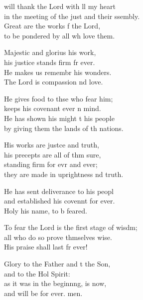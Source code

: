 \settowidth{\versewidth}{To fear the Lord is the first stage of wisdom; +}
\begin{psalmverse}%
  \begin{patverse}
 will thank the Lord with ll my heart\Med\\
    in the meeting of the just and their ssembly.\\
Great are the works f the Lord,\Med\\
    to be pondered by all wh love them.

Majestic and glorius his work,\Med\\
    his justice stands firm fr ever.\\
He makes us remembr his wonders.\Med\\
    The Lord is compassion nd love.

He gives food to thse who fear him;\Med\\
    keeps his covenant ever \pointup{\i}n mind.\\
He has shown his might t his people\Med\\
    by giving them the lands of th nations.

His works are just\pointup{\i}ce and truth,\Med\\
    his precepts are all of thm sure,\\
standing firm for evr and ever;\Med\\
    they are made in uprightness nd truth.

He has sent deliverance to his peopl\Flex\\
    and established his covennt for ever.\Med\\
    Holy his name, to b feared.

To fear the Lord is the first stage of wisdm;\Flex\\
    all who do so prove thmselves wise.\Med\\
His praise shall last fr ever!

Glory to the Father and t the Son,\Med\\
    and to the Hol Spirit:\\
as it was in the beginn\pointup{\i}ng, is now,\Med\\
    and will be for ever. men.
  \end{patverse}
\end{psalmverse}
